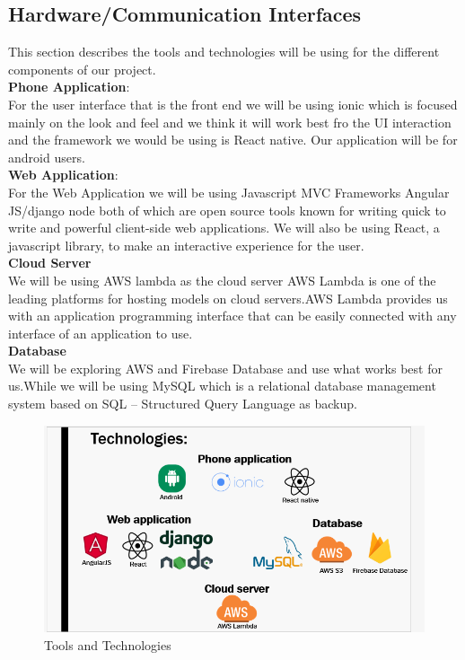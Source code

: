 \subsection{Hardware/Communication Interfaces}
This section describes the tools and technologies will be using for the different components of our project.\\
\textbf{Phone Application}:\\
For the user interface that is the front end we will be using ionic which is focused mainly on the look and feel and we think it will work best fro the UI interaction and the framework we would be using is React native. Our application will be for android users.\\
\textbf{Web Application}:\\
For the Web Application we will be using Javascript MVC Frameworks Angular JS/django node both of which are open source tools known for writing quick to write and powerful client-side web applications. We will also be using React, a javascript library, to make an interactive experience for the user.\\
\textbf{Cloud Server}\\
We will be using AWS lambda as the cloud server AWS Lambda is one of the leading platforms for hosting models on cloud servers.AWS Lambda provides us with an application programming interface that can be easily connected with any interface of an application to use.\\
\textbf{Database} \\
We will be exploring AWS and Firebase Database and use what works best for us.While we will be using MySQL which is a relational database management system based on SQL – Structured Query Language as backup.
\begin{figure}[!hb]
   \centering

   \includegraphics[scale=0.5]{images/Tech.PNG}

 
   \caption{Tools and Technologies}\label{fig:picture}
\end{figure}
\newpage
